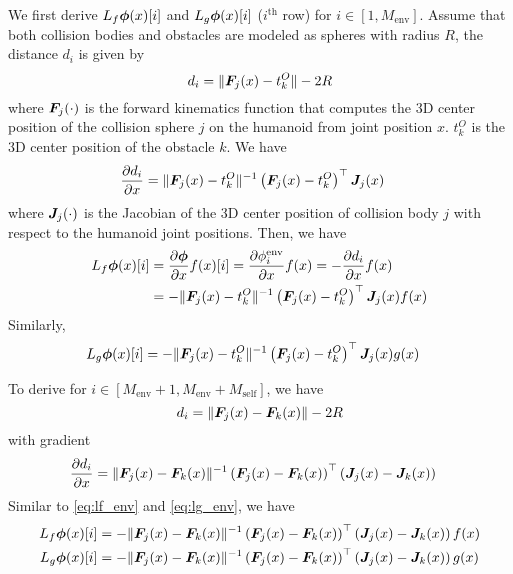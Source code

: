 We first derive $L_f\bm{\phi}(x)[i]$ and $L_g\bm{\phi}(x)[i]$ ($i^\mathrm{th}$ row) for $i\in[1,M_\mathrm{env}]$.
Assume that both collision bodies and obstacles are modeled as spheres with radius $R$, the distance $d_i$ is given by
\begin{equation}
    d_i = \|\bm{F}_j(x) - t^O_k\| - 2R
\end{equation}
where $\bm{F}_j(\cdot)$ is the forward kinematics function that computes the 3D center position of the collision sphere $j$ on the humanoid from joint position $x$.
$t^O_k$ is the 3D center position of the obstacle $k$.
We have
\begin{align}
    \frac{\partial d_i}{\partial x} &= \|\bm{F}_j(x) - t^O_k\|^{-1}\left(\bm{F}_j(x) - t^O_k\right)^\top \bm{J}_j(x)
\end{align}
where $\bm{J}_j(\cdot)$ is the Jacobian of the 3D center position of collision body $j$ with respect to the humanoid joint positions.
Then, we have
\begin{align}
    L_f\bm{\phi}(x)[i] &= \frac{\partial\bm{\phi}}{\partial x}f(x)[i] = \frac{\partial\phi^\mathrm{env}_i}{\partial x}f(x) = - \frac{\partial d_i}{\partial x}f(x) \\
    &= -\|\bm{F}_j(x) - t^O_k\|^{-1}\left(\bm{F}_j(x) - t^O_k\right)^\top \bm{J}_j(x) f(x) \label{eq:lf_env}
\end{align}
Similarly,
\begin{align}
    L_g\bm{\phi}(x)[i] &= -\|\bm{F}_j(x) - t^O_k\|^{-1}\left(\bm{F}_j(x) - t^O_k\right)^\top \bm{J}_j(x) g(x) \label{eq:lg_env}
\end{align}

To derive for $i\in[M_\mathrm{env}+1,M_\mathrm{env}+M_\mathrm{self}]$, we have
\begin{equation}
    d_i = \|\bm{F}_j(x) - \bm{F}_k(x)\| - 2R
\end{equation}
with gradient
\begin{align}
    \frac{\partial d_i}{\partial x} &= \|\bm{F}_j(x) - \bm{F}_k(x)\|^{-1}\left(\bm{F}_j(x) - \bm{F}_k(x)\right)^\top \left(\bm{J}_j(x) - \bm{J}_k(x)\right)
\end{align}
Similar to \eqref{eq:lf_env} and \eqref{eq:lg_env}, we have
\begin{align}
    L_f\bm{\phi}(x)[i] &= -\|\bm{F}_j(x) - \bm{F}_k(x)\|^{-1}\left(\bm{F}_j(x) - \bm{F}_k(x)\right)^\top \left(\bm{J}_j(x) - \bm{J}_k(x)\right) f(x) \\
    L_g\bm{\phi}(x)[i] &= -\|\bm{F}_j(x) - \bm{F}_k(x)\|^{-1}\left(\bm{F}_j(x) - \bm{F}_k(x)\right)^\top \left(\bm{J}_j(x) - \bm{J}_k(x)\right) g(x)
\end{align}

